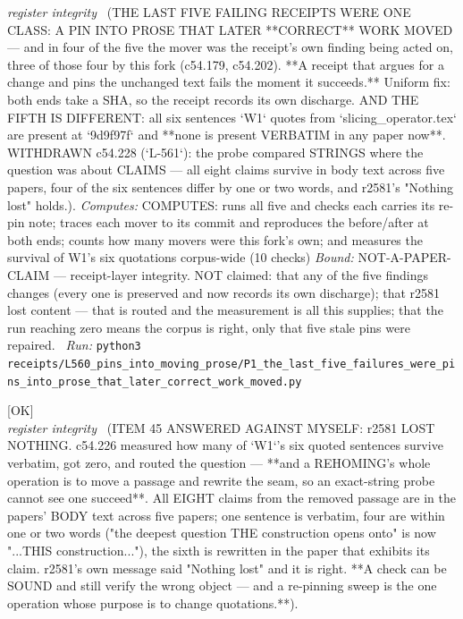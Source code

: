 \begin{description}
\textit{register integrity} \ (THE LAST FIVE FAILING RECEIPTS WERE ONE CLASS: A PIN INTO PROSE THAT LATER **CORRECT** WORK MOVED --- and in four of the five the mover was the receipt's own finding being acted on, three of those four by this fork (c54.179, c54.202). **A receipt that argues for a change and pins the unchanged text fails the moment it succeeds.** Uniform fix: both ends take a SHA, so the receipt records its own discharge.  AND THE FIFTH IS DIFFERENT: all six sentences `W1` quotes from `slicing\_operator.tex` are present at `9d9f97f` and **none is present VERBATIM in any paper now**.  WITHDRAWN c54.228 (`L-561`): the probe compared STRINGS where the question was about CLAIMS --- all eight claims survive in body text across five papers, four of the six sentences differ by one or two words, and r2581's "Nothing lost" holds.). 
\emph{Computes:} COMPUTES: runs all five and checks each carries its re-pin note; traces each mover to its commit and reproduces the before/after at both ends; counts how many movers were this fork's own; and measures the survival of W1's six quotations corpus-wide (10 checks)
 \emph{Bound:} NOT-A-PAPER-CLAIM --- receipt-layer integrity. NOT claimed: that any of the five findings changes (every one is preserved and now records its own discharge); that r2581 lost content --- that is routed and the measurement is all this supplies; that the run reaching zero means the corpus is right, only that five stale pins were repaired.
\ \emph{Run:} \texttt{python3 receipts/L560\_pins\_into\_moving\_prose/P1\_the\_last\_five\_failures\_were\_pins\_into\_prose\_that\_later\_correct\_work\_moved.py}
\item[\label{rcpt:C1_item_45_answered_against_myself_the_rehoming_lost_nothing}\texttt{C1\_item\_45\_answered\_against\_myself\_the\_rehoming\_lost\_nothing}]\hfill\textsf{[OK]}\\
\textit{register integrity} \ (ITEM 45 ANSWERED AGAINST MYSELF: r2581 LOST NOTHING. c54.226 measured how many of `W1`'s six quoted sentences survive verbatim, got zero, and routed the question --- **and a REHOMING's whole operation is to move a passage and rewrite the seam, so an exact-string probe cannot see one succeed**. All EIGHT claims from the removed passage are in the papers' BODY text across five papers; one sentence is verbatim, four are within one or two words ("the deepest question THE construction opens onto" is now "...THIS construction..."), the sixth is rewritten in the paper that exhibits its claim. r2581's own message said "Nothing lost" and it is right. **A check can be SOUND and still verify the wrong object --- and a re-pinning sweep is the one operation whose purpose is to change quotations.**). 

\end{description}
